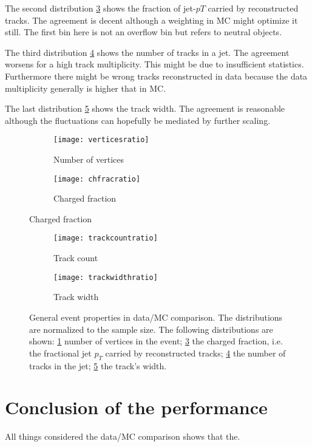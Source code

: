 The second distribution \ref{fig:chfrac} shows the fraction of jet-$pT$ carried by reconstructed tracks. The agreement is decent although a weighting in MC might optimize it still. The first bin here is not an overflow bin but refers to neutral objects.

The third distribution \ref{fig:trackcount} shows the number of tracks in a jet. The agreement worsens for a high track multiplicity. This might be due to insufficient statistics. Furthermore there might be wrong tracks reconstructed in data because the data multiplicity generally is higher that in MC.

The last distribution \ref{fig:trackwidth} shows the track width. The agreement is reasonable although the fluctuations can hopefully be mediated by further scaling.

\begin{figure}[h]
\centering
\begin{subfigure}[b]{0.5\figwidth}
\texttt{[image: verticesratio]}
\caption[Number of vertices]{Number of vertices}
\label{fig:vertices}
\end{subfigure}
\quad
\begin{subfigure}[b]{0.5\figwidth}
\texttt{[image: chfracratio]}
\caption[Charged fraction]{Charged fraction}
\label{fig:chfrac}
\end{subfigure}
\end{figure}


\begin{figure}[h]
\centering
\begin{subfigure}[b]{0.5\figwidth}
\texttt{[image: trackcountratio]}
\caption[Track count]{Track count}
\label{fig:trackcount}
\end{subfigure}
\quad
\begin{subfigure}[b]{0.5\figwidth}
\texttt{[image: trackwidthratio]}
\caption[trackwidth]{Track width}
\label{fig:trackwidth}
\end{subfigure}
\caption{General event properties in data/MC comparison. The distributions are normalized to the sample size. The following distributions are shown: \ref{fig:vertices} number of vertices in the event; \ref{fig:chfrac} the charged fraction, i.e. the fractional jet $p_T$ carried by reconstructed tracks; \ref{fig:trackcount} the number of tracks in the jet; \ref{fig:trackwidth} the track's width.}
\label{fig:generalproperties}
\end{figure}


\section{Conclusion of the performance}

All things considered the data/MC comparison shows that the.


\label{results}
